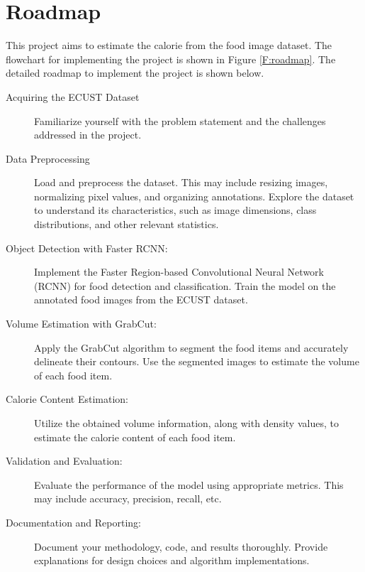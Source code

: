\documentclass[12pt, a4paper, twoside]{article}
\begin{document}
\section{Roadmap}
This project aims to estimate the calorie from the food image dataset. The flowchart for implementing the project is shown in Figure \ref{F:roadmap}. The detailed roadmap to implement the project is shown below.
\begin{description}
	\item[Acquiring the ECUST Dataset] Familiarize yourself with the problem statement and the challenges addressed in the project.
	\item[Data Preprocessing] Load and preprocess the dataset. This may include resizing images, normalizing pixel values, and organizing annotations. Explore the dataset to understand its characteristics, such as image dimensions, class distributions, and other relevant statistics.
	\item[Object Detection with Faster RCNN:] Implement the Faster Region-based Convolutional Neural Network (RCNN) for food detection and classification. Train the model on the annotated food images from the ECUST dataset.
	\item[Volume Estimation with GrabCut:] Apply the GrabCut algorithm to segment the food items and accurately delineate their contours. Use the segmented images to estimate the volume of each food item.
	\item[Calorie Content Estimation:] Utilize the obtained volume information, along with density values, to estimate the calorie content of each food item.
	\item[Validation and Evaluation:] Evaluate the performance of the model using appropriate metrics. This may include accuracy, precision, recall, etc.
	\item[Documentation and Reporting:] Document your methodology, code, and results thoroughly. Provide explanations for design choices and algorithm implementations.
\end{description}
\end{document}
